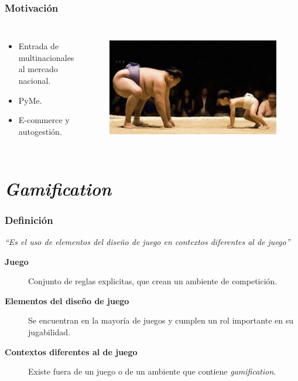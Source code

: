 \documentclass[10pt, compress]{beamer}
\begin{document}
\begin{frame}[fragile]
    \frametitle{Motivación}
    \begin{columns}[onlytextwidth]
            \begin{itemize}
                \item Entrada de multinacionales \\
                      al mercado nacional.
                \item PyMe.
                \item E-commerce y autogestión.
            \end{itemize}

            \begin{figure}
                \centering
                \includegraphics[width=1\textwidth]{images/pymes.jpg}
                \label{fig:awesom_image}
            \end{figure}
    \end{columns}
\end{frame}

\section{\emph{Gamification}}

\begin{frame}[fragile]
  \frametitle{Definición}
    \begin{center}
        \emph{``Es el uso de elementos del diseño de juego en contextos diferentes
        al de juego''}
    \end{center}

\begin{description}
 \item[\textbf{Juego}] Conjunto de reglas explicitas, que crean un ambiente de competición.
 \item[\textbf{Elementos del diseño de juego}] Se encuentran en la mayoría de juegos y cumplen un rol importante
en su jugabilidad.
 \item[\textbf{Contextos diferentes al de juego}] Existe fuera de un juego o de un ambiente que contiene \emph{gamification}.
\end{description}
\end{frame}
\end{document}
